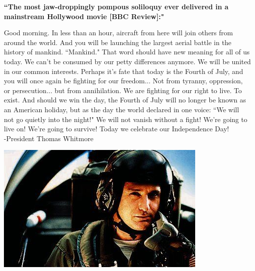 \documentclass[12pt]{article}
\begin{document}
\begin{center}
{\bf ``The most jaw-droppingly pompous soliloquy ever delivered in a mainstream Hollywood movie [BBC Review]:"}
\end{center}

Good morning. In less than an hour, aircraft from here will join others from around the world. And you will be launching the largest aerial battle in the history of mankind. ``Mankind." That word should have new meaning for all of us today. We can't be consumed by our petty differences anymore. We will be united in our common interests. Perhaps it's fate that today is the Fourth of July, and you will once again be fighting for our freedom... Not from tyranny, oppression, or persecution... but from annihilation. We are fighting for our right to live. To exist. And should we win the day, the Fourth of July will no longer be known as an American holiday, but as the day the world declared in one voice: ``We will not go quietly into the night!" We will not vanish without a fight! We're going to live on! We're going to survive! Today we celebrate our Independence Day!\\

-President Thomas Whitmore

\includegraphics[scale=0.25]{bps.jpg}
\end{document}
